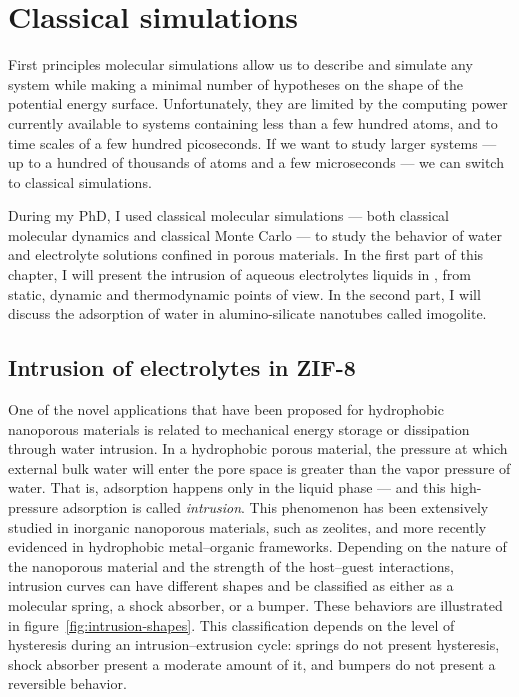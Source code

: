\documentclass[thesis]{subfiles}
\begin{document}
\OnlyInSubfile{\setcounter{chapter}{4}}
\chapter{Classical simulations}
\label{sec:classical}

First principles molecular simulations allow us to describe and simulate any
system while making a minimal number of hypotheses on the shape of the potential
energy surface. Unfortunately, they are limited by the computing power currently
available to systems containing less than a few hundred atoms, and to time
scales of a few hundred picoseconds. If we want to study larger systems --- up
to a hundred of thousands of atoms and a few microseconds --- we can switch to
classical simulations.

During my PhD, I used classical molecular simulations --- both classical
molecular dynamics and classical Monte Carlo --- to study the behavior of water
and electrolyte solutions confined in porous materials. In the first part of
this chapter, I will present the intrusion of aqueous electrolytes liquids
in , from static, dynamic and thermodynamic points of view. In the second
part, I will discuss the adsorption of water in alumino-silicate nanotubes
called imogolite.

\newpage
\section{Intrusion of electrolytes in ZIF-8}
\label{sec:zif8-intrusion}

One of the novel applications that have been proposed for hydrophobic nanoporous
materials is related to mechanical energy storage or dissipation through water
intrusion\cite{Eroshenko2001, Soulard2004}. In a hydrophobic porous material,
the pressure at which external bulk water will enter the pore space is greater
than the vapor pressure of water. That is, adsorption happens only in the liquid
phase --- and this high-pressure adsorption is called
\emph{intrusion}\cite{Fraux2017}. This phenomenon has been extensively studied
in inorganic nanoporous materials, such as zeolites\cite{Saada2010,
Desbiens2005, Humplik2014a, Humplik2014b}, and more recently evidenced in
hydrophobic metal--organic frameworks\cite{Ortiz2013, Grosu2015,
MichelinJamois2015}. Depending on the nature of the nanoporous material and the
strength of the host--guest interactions, intrusion curves can have different
shapes and be classified as either as a molecular spring, a shock absorber, or a
bumper. These behaviors are illustrated in figure~\ref{fig:intrusion-shapes}.
This classification depends on the level of hysteresis during an
intrusion--extrusion cycle: springs do not present hysteresis, shock absorber
present a moderate amount of it, and bumpers do not present a reversible
behavior.
\end{document}
